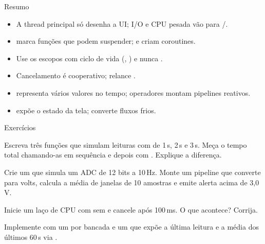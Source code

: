 \documentclass[aspectratio=169,10pt]{beamer}
\begin{document}
\begin{frame}{Resumo}
  \begin{resumo}
    \begin{itemize}
      \item A thread principal só desenha a UI; I/O e CPU pesada vão para /.
      \item {} marca funções que podem suspender;  e  criam coroutines.
      \item Use os escopos com ciclo de vida (, ) e nunca .
      \item Cancelamento é cooperativo; relance .
      \item {} representa vários valores no tempo; operadores montam pipelines reativos.
      \item {} expõe o estado da tela;  converte fluxos frios.
    \end{itemize}
  \end{resumo}
\end{frame}

\begin{frame}{Exercícios}
  \begin{exercicio}
    Escreva três funções  que simulam leituras com  de 1\,s, 2\,s e 3\,s. Meça o tempo total chamando-as em sequência e depois com . Explique a diferença.
  \end{exercicio}
  \begin{exercicio}
    Crie um  que simula um ADC de 12 bits a 10\,Hz. Monte um pipeline que converte para volts, calcula a média de janelas de 10 amostras e emite alerta acima de 3,0\,V.
  \end{exercicio}
  \begin{exercicio}
    Inicie um laço de CPU com  sem  e cancele após 100\,ms. O que acontece? Corrija.
  \end{exercicio}
  \begin{projeto}
    Implemente  com um  por bancada e um  que expõe a última leitura e a média dos últimos 60\,s via .
  \end{projeto}
\end{frame}
\end{document}

